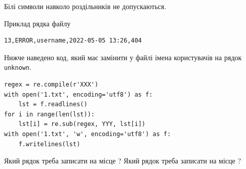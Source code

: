 \documentclass[12pt, ukrainian]{article}
\def\code#1{\Verb!#1!}
\begin{document}
{Білі символи навколо роздільників не допускаються.

Приклад рядка файлу



\begin{verbatim}
13,ERROR,username,2022-05-05 13:26,404
\end{verbatim}


Нижче наведено код, який має замінити у файлі імена користувачів на рядок \code{unknown}.



\begin{verbatim}
regex = re.compile(r'XXX')
with open('1.txt', encoding='utf8') as f:
    lst = f.readlines()
for i in range(len(lst)):
    lst[i] = re.sub(regex, YYY, lst[i])
with open('1.txt', 'w', encoding='utf8') as f:
    f.writelines(lst)
\end{verbatim}





Який рядок треба записати на місце  ?
Який рядок треба записати на місце  ?\par

}
\newpage
\end{document}
